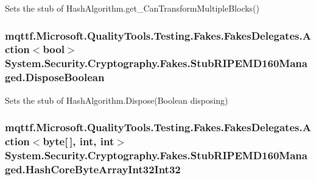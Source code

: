 Sets the stub of Hash\-Algorithm.\-get\-\_\-\-Can\-Transform\-Multiple\-Blocks()

\hypertarget{class_system_1_1_security_1_1_cryptography_1_1_fakes_1_1_stub_r_i_p_e_m_d160_managed_adceb78f24d8d2a96b50f84a36c9f6602}{
\subsubsection[{Dispose\-Boolean}]{\setlength{\rightskip}{0pt plus 5cm}mqttf.\-Microsoft.\-Quality\-Tools.\-Testing.\-Fakes.\-Fakes\-Delegates.\-Action$<$bool$>$ System.\-Security.\-Cryptography.\-Fakes.\-Stub\-R\-I\-P\-E\-M\-D160\-Managed.\-Dispose\-Boolean}}\label{class_system_1_1_security_1_1_cryptography_1_1_fakes_1_1_stub_r_i_p_e_m_d160_managed_adceb78f24d8d2a96b50f84a36c9f6602}


Sets the stub of Hash\-Algorithm.\-Dispose(\-Boolean disposing)

\hypertarget{class_system_1_1_security_1_1_cryptography_1_1_fakes_1_1_stub_r_i_p_e_m_d160_managed_a431b3068806c2903bc77591fff22aef5}{
\subsubsection[{Hash\-Core\-Byte\-Array\-Int32\-Int32}]{\setlength{\rightskip}{0pt plus 5cm}mqttf.\-Microsoft.\-Quality\-Tools.\-Testing.\-Fakes.\-Fakes\-Delegates.\-Action$<$byte\mbox{[}$\,$\mbox{]}, int, int$>$ System.\-Security.\-Cryptography.\-Fakes.\-Stub\-R\-I\-P\-E\-M\-D160\-Managed.\-Hash\-Core\-Byte\-Array\-Int32\-Int32}}\label{class_system_1_1_security_1_1_cryptography_1_1_fakes_1_1_stub_r_i_p_e_m_d160_managed_a431b3068806c2903bc77591fff22aef5}


